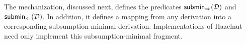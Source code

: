 The mechanization, discussed next, defines the predicates $\mathsf{submin}_{\Rightarrow}(\mathcal{D})$ and $\mathsf{submin}_{\Leftarrow}(\mathcal{D})$. In addition, it defines a mapping from
any derivation into a corresponding subsumption-minimal derivation. Implementations of Hazelnut need only implement this subsumption-minimal fragment.
